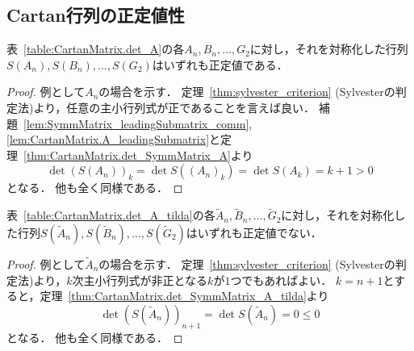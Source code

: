 \subsection{Cartan行列の正定値性}

\begin{theorem}
  \label{thm:CartanMatrix.A_isPosDef}
  \leanok
  表~\ref{table:CartanMatrix.det_A}の各$A_n, B_n, \ldots, G_2$に対し，それを対称化した行列$S(A_n), S(B_n), \ldots, S(G_2)$はいずれも正定値である．
\end{theorem}

\begin{proof}
  例として$A_n$の場合を示す．
  定理~\ref{thm:sylvester_criterion} (Sylvesterの判定法)より，任意の主小行列式が正であることを言えば良い．
  補題~\ref{lem:SymmMatrix_leadingSubmatrix_comm}, \ref{lem:CartanMatrix.A_leadingSubmatrix}と定理~\ref{thm:CartanMatrix.det_SymmMatrix_A}より
  \begin{equation}
    \det (S(A_n))_k
    = \det S((A_n)_k)
    = \det S(A_k)
    = k + 1
    > 0
  \end{equation}
  となる．
  他も全く同様である．
\end{proof}

\begin{theorem}
  \label{thm:CCartanMatrix.A_tilda_isNotPosDef}
  \leanok
  表~\ref{table:CartanMatrix.det_A_tilda}の各$\widetilde{A}_n, \widetilde{B}_n, \ldots, \widetilde{G}_2$に対し，それを対称化した行列$S(\widetilde{A}_n), S(\widetilde{B}_n), \ldots, S(\widetilde{G}_2)$はいずれも正定値でない．
\end{theorem}

\begin{proof}
  例として$\widetilde{A}_n$の場合を示す．
  定理~\ref{thm:sylvester_criterion} (Sylvesterの判定法)より，$k$次主小行列式が非正となる$k$が$1$つでもあればよい．
  $k = n + 1$とすると，定理~\ref{thm:CartanMatrix.det_SymmMatrix_A_tilda}より
  \begin{equation}
    \det (S(\widetilde{A}_n))_{n+1}
    = \det S(\widetilde{A}_n)
    = 0
    \le 0
  \end{equation}
  となる．
  他も全く同様である．
\end{proof}